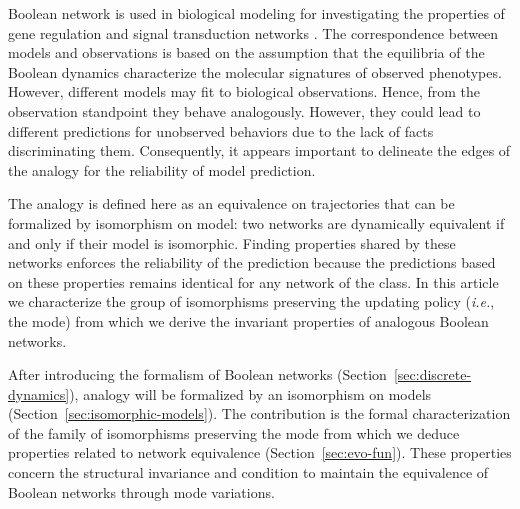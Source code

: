 \documentclass[12pt]{elsarticle}
\newcommand{\abbrev}[1]{#1, \relax}
\newcommand{\ie}[0]{\abbrev{\textit{i.e.}}}
\begin{document}
Boolean network is used in biological modeling for investigating the properties of gene regulation and signal transduction networks \cite{Thomas1991,Garg2007, Demongeot2010, Delaplace2010}. The correspondence between models and observations is based on the assumption that the equilibria of the Boolean dynamics characterize the molecular signatures of observed phenotypes.  However, different models may fit to biological observations. Hence, from the observation standpoint they behave analogously. However,  they  could lead to different predictions for unobserved behaviors due to the lack of facts discriminating them. Consequently, it appears important to delineate the edges of the analogy for the reliability of model prediction.  

The analogy is defined here as an equivalence on trajectories that can be formalized by isomorphism on model: two networks are dynamically equivalent if and only if their model is isomorphic. Finding properties shared by these networks enforces the reliability of the prediction  because the predictions based on these properties remains identical for any network of the class. In this article we characterize the group of isomorphisms preserving the updating policy (\ie the mode) from which we derive the invariant properties of analogous Boolean networks. 

After introducing the formalism of Boolean networks (Section~\ref{sec:discrete-dynamics}), analogy will be formalized by an isomorphism on models (Section~\ref{sec:isomorphic-models}). The contribution is the formal characterization of the family of isomorphisms preserving the mode from which we deduce properties related to network equivalence (Section~\ref{sec:evo-fun}). These properties concern the structural invariance and condition to maintain the equivalence of Boolean networks through mode variations.
\end{document}
